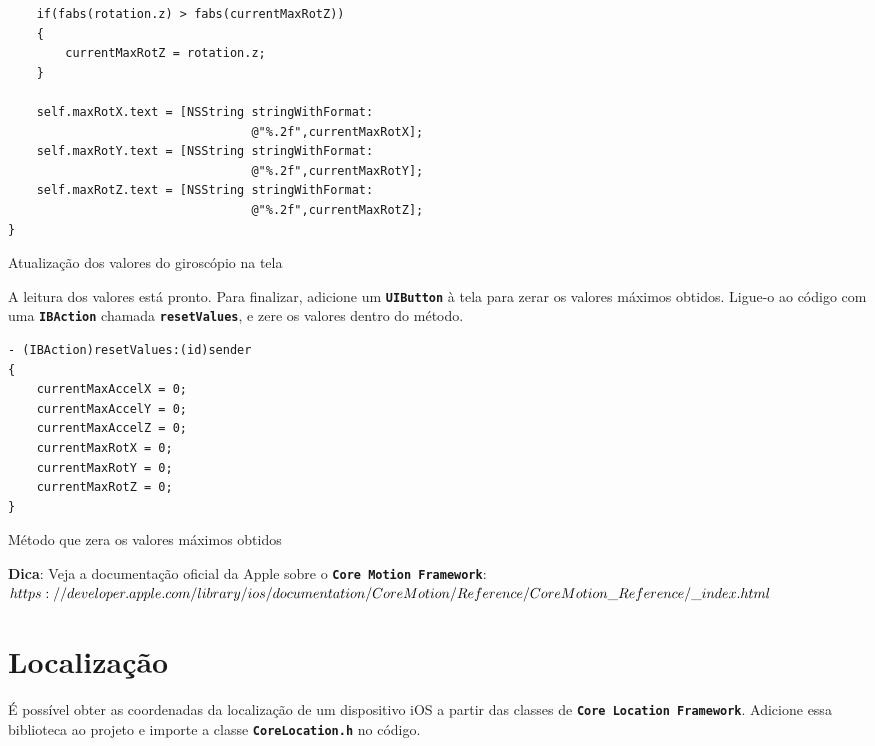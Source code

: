 \documentclass[a4paper,12pt,brazil,doubleside]{book}
\begin{document}
\begin{singlespace}
\begin{listing}[H]
\begin{verbatim}
    if(fabs(rotation.z) > fabs(currentMaxRotZ))
    {
        currentMaxRotZ = rotation.z;
    }
    
    self.maxRotX.text = [NSString stringWithFormat:
                                  @"%.2f",currentMaxRotX];
    self.maxRotY.text = [NSString stringWithFormat:
                                  @"%.2f",currentMaxRotY];
    self.maxRotZ.text = [NSString stringWithFormat:
                                  @"%.2f",currentMaxRotZ];
}
\end{verbatim}
\caption{Atualização dos valores do giroscópio na tela}
\end{listing}


A leitura dos valores está pronto. Para finalizar, adicione um \texttt{\textbf{UIButton}} à tela para zerar os valores máximos obtidos. Ligue-o ao código com uma \texttt{\textbf{IBAction}} chamada \texttt{\textbf{resetValues}}, e zere os valores dentro do método.

\begin{listing}[H]
\begin{verbatim}
- (IBAction)resetValues:(id)sender
{
    currentMaxAccelX = 0;
    currentMaxAccelY = 0;
    currentMaxAccelZ = 0;
    currentMaxRotX = 0;
    currentMaxRotY = 0;
    currentMaxRotZ = 0;
}
\end{verbatim}
\caption{Método que zera os valores máximos obtidos}
\end{listing}

\bigskip

\begin{framed}

\textbf{Dica}: Veja a documentação oficial da Apple sobre o \texttt{\textbf{Core Motion Framework}}:\\
\(https://developer.apple.com/library/ios/documentation/CoreMotion/Reference/\\CoreMotion\_Reference/\_index.html\)

\end{framed}

\section{Localização}


É possível obter as coordenadas da localização de um dispositivo iOS a partir das classes de \texttt{\textbf{Core Location Framework}}. Adicione essa biblioteca ao projeto e importe a classe \texttt{\textbf{CoreLocation.h}} no código.


\end{singlespace}
\end{document}
